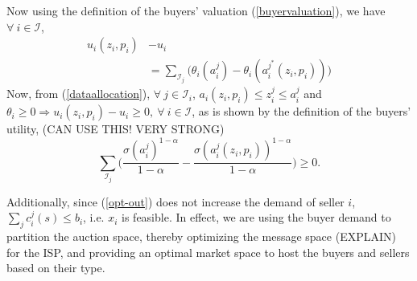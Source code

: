 \documentclass[12pt]{article}
\theoremstyle{definition}
\newcommand{\mcI}{\mathcal{I}}
\begin{document}
\begin{multicols}{2}
Now using the definition of
the buyers' valuation (\ref{buyervaluation}), we have $\forall \ i \in\mcI$,
\begin{align*}
    u_i(z_i,p_i) &- u_i \\
    &=\displaystyle\sum_{\mcI_j}\bigg(\theta_i(a_i^j)-
\theta_i(a_i^{j^*}(z_i,p_i))\bigg) 
\end{align*}
Now, from (\ref{dataallocation}), $\forall \ j\in\mcI_i$, $a_i(z_i,p_i) \le
z_i^j \le a_i^j$ and $\theta_i\ge 0 \Rightarrow u_i(z_i,p_i) - u_i \ge 0,
\ \forall \ i\in \mcI$, as is shown by the definition of the buyers' utility,
(CAN USE THIS! VERY STRONG)
$$
     \sum_{\mcI_j}\bigg(\frac{\sigma (a_i^j)^{1-\alpha}}{1-\alpha}
-\frac{\sigma (a_i^j(z_i,p_i))^{1-\alpha}}{1-\alpha}\bigg)
     \ge 0.
$$

Additionally, since (\ref{opt-out}) does
not increase the demand of seller $i$, $\sum_j c_i^j(s) \le b_i$, i.e. $x_i$ is feasible.
In effect, we are using the buyer demand
to partition the auction space, thereby 
optimizing the message space (EXPLAIN) for the
ISP, and providing an optimal market space to host the buyers and sellers based
on their type. \\


\end{multicols}
\end{document}
